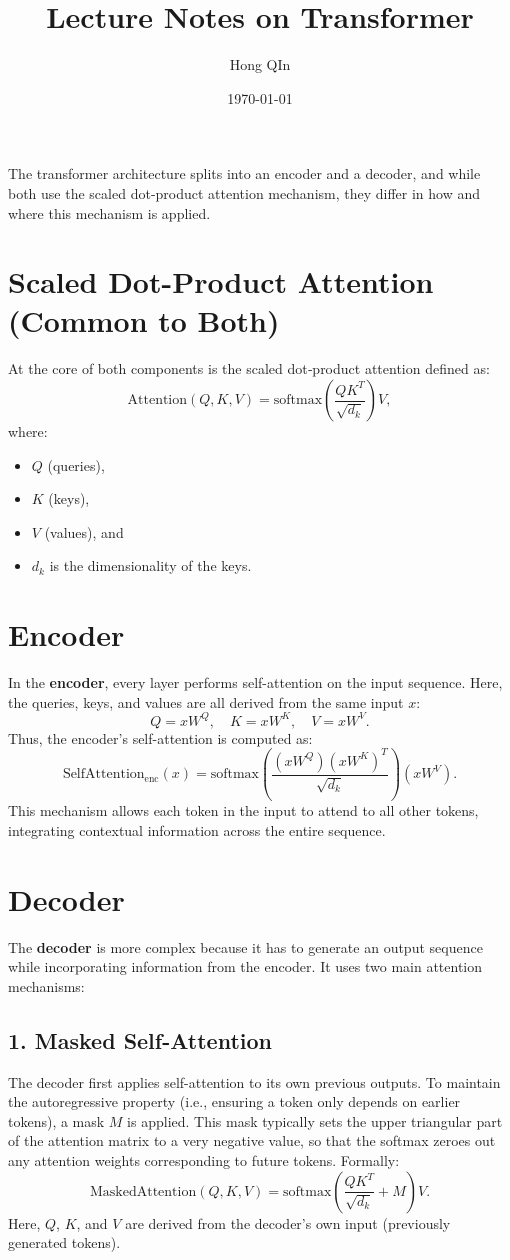 \documentclass{article}
\title{Lecture Notes on Transformer}
\author{Hong QIn}
\date{\today}
\begin{document}
\maketitle

The transformer architecture splits into an encoder and a decoder, and while both use the scaled dot‐product attention mechanism, they differ in how and where this mechanism is applied.

\section*{Scaled Dot-Product Attention (Common to Both)}

At the core of both components is the scaled dot‐product attention defined as:
\[
\text{Attention}(Q, K, V) = \text{softmax}\!\left(\frac{QK^T}{\sqrt{d_k}}\right) V,
\]
where:
\begin{itemize}[noitemsep]
    \item \( Q \) (queries),
    \item \( K \) (keys),
    \item \( V \) (values), and
    \item \( d_k \) is the dimensionality of the keys.
\end{itemize}

\section*{Encoder}

In the \textbf{encoder}, every layer performs self-attention on the input sequence. Here, the queries, keys, and values are all derived from the same input \( x \):
\[
Q = xW^Q,\quad K = xW^K,\quad V = xW^V.
\]
Thus, the encoder’s self-attention is computed as:
\[
\text{SelfAttention}_{\text{enc}}(x) = \text{softmax}\!\left(\frac{(xW^Q)(xW^K)^T}{\sqrt{d_k}}\right)(xW^V).
\]
This mechanism allows each token in the input to attend to all other tokens, integrating contextual information across the entire sequence.

\section*{Decoder}

The \textbf{decoder} is more complex because it has to generate an output sequence while incorporating information from the encoder. It uses two main attention mechanisms:

\subsection*{1. Masked Self-Attention}
The decoder first applies self-attention to its own previous outputs. To maintain the autoregressive property (i.e., ensuring a token only depends on earlier tokens), a mask \( M \) is applied. This mask typically sets the upper triangular part of the attention matrix to a very negative value, so that the softmax zeroes out any attention weights corresponding to future tokens. Formally:
\[
\text{MaskedAttention}(Q, K, V) = \text{softmax}\!\left(\frac{QK^T}{\sqrt{d_k}} + M\right)V.
\]
Here, \( Q \), \( K \), and \( V \) are derived from the decoder’s own input (previously generated tokens).
\end{document}
